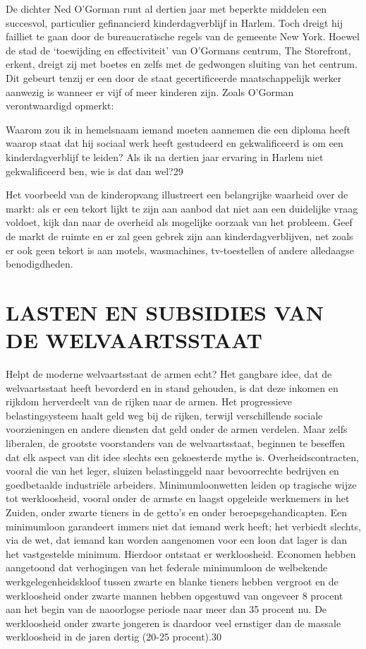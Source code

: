 \documentclass[
  a5paper,
  smalldemyvopaper,10pt,twoside,onecolumn,openright,extrafontsizes,hidelinks]{memoir}
\renewenvironment{quote}%
               {\list{}{\rightmargin=.6cm\leftmargin=.6cm}%
                \itshape \item[]}%
               {\endlist}
\begin{document}
De dichter Ned O'Gorman runt al dertien jaar met beperkte middelen een
succesvol, particulier gefinancierd kinderdagverblijf in Harlem. Toch
dreigt hij failliet te gaan door de bureaucratische regels van de
gemeente New York. Hoewel de stad de `toewijding en effectiviteit' van
O'Gormans centrum, The Storefront, erkent, dreigt zij met boetes en
zelfs met de gedwongen sluiting van het centrum. Dit gebeurt tenzij er
een door de staat gecertificeerde maatschappelijk werker aanwezig is
wanneer er vijf of meer kinderen zijn. Zoals O'Gorman verontwaardigd
opmerkt:

\begin{quote}
Waarom zou ik in hemelsnaam iemand moeten aannemen die een diploma heeft
waarop staat dat hij sociaal werk heeft gestudeerd en gekwalificeerd is
om een kinderdagverblijf te leiden? Als ik na dertien jaar ervaring in
Harlem niet gekwalificeerd ben, wie is dat dan wel?29
\end{quote}

Het voorbeeld van de kinderopvang illustreert een belangrijke waarheid
over de markt: als er een tekort lijkt te zijn aan aanbod dat niet aan
een duidelijke vraag voldoet, kijk dan naar de overheid als mogelijke
oorzaak van het probleem. Geef de markt de ruimte en er zal geen gebrek
zijn aan kinderdagverblijven, net zoals er ook geen tekort is aan
motels, wasmachines, tv-toestellen of andere alledaagse benodigdheden.

\section{LASTEN EN SUBSIDIES VAN DE
WELVAARTSSTAAT}\label{lasten-en-subsidies-van-de-welvaartsstaat}

Helpt de moderne welvaartsstaat de armen echt? Het gangbare idee, dat de
welvaartsstaat heeft bevorderd en in stand gehouden, is dat deze inkomen
en rijkdom herverdeelt van de rijken naar de armen. Het progressieve
belastingsysteem haalt geld weg bij de rijken, terwijl verschillende
sociale voorzieningen en andere diensten dat geld onder de armen
verdelen. Maar zelfs liberalen, de grootste voorstanders van de
welvaartsstaat, beginnen te beseffen dat elk aspect van dit idee slechts
een gekoesterde mythe is. Overheidscontracten, vooral die van het leger,
sluizen belastinggeld naar bevoorrechte bedrijven en goedbetaalde
industriële arbeiders. Minimumloonwetten leiden op tragische wijze tot
werkloosheid, vooral onder de armste en laagst opgeleide werknemers in
het Zuiden, onder zwarte tieners in de getto's en onder
beroepsgehandicapten. Een minimumloon garandeert immers niet dat iemand
werk heeft; het verbiedt slechts, via de wet, dat iemand kan worden
aangenomen voor een loon dat lager is dan het vastgestelde minimum.
Hierdoor ontstaat er werkloosheid. Economen hebben aangetoond dat
verhogingen van het federale minimumloon de welbekende
werkgelegenheidskloof tussen zwarte en blanke tieners hebben vergroot en
de werkloosheid onder zwarte mannen hebben opgestuwd van ongeveer 8
procent aan het begin van de naoorlogse periode naar meer dan 35 procent
nu. De werkloosheid onder zwarte jongeren is daardoor veel ernstiger dan
de massale werkloosheid in de jaren dertig (20-25 procent).30
\end{document}
